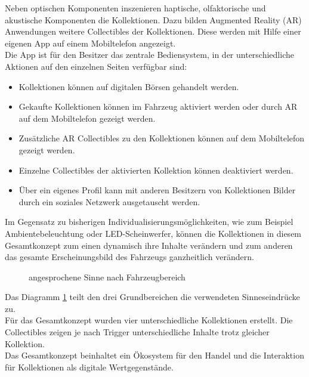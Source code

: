 Neben optischen Komponenten inszenieren haptische, olfaktorische und akustische Komponenten die Kollektionen. Dazu bilden Augmented Reality (AR) Anwendungen weitere Collectibles der Kollektionen. Diese werden mit Hilfe einer eigenen App auf einem Mobiltelefon angezeigt.\\
Die App ist für den Besitzer das zentrale Bediensystem, in der unterschiedliche Aktionen auf den einzelnen Seiten verfügbar sind:
\begin{itemize}
	\item Kollektionen können auf digitalen Börsen gehandelt werden.
	\item Gekaufte Kollektionen können im Fahrzeug aktiviert werden oder durch AR auf dem Mobiltelefon gezeigt werden.
	\item Zusätzliche AR Collectibles zu den Kollektionen können auf dem Mobiltelefon gezeigt werden.
	\item Einzelne Collectibles der aktivierten Kollektion können deaktiviert werden.
	\item Über ein eigenes Profil kann mit anderen Besitzern von Kollektionen Bilder durch ein soziales Netzwerk ausgetauscht werden.
\end{itemize}
Im Gegensatz zu bisherigen Individualisierungsmöglichkeiten, wie zum Beispiel Ambientebeleuchtung oder LED-Scheinwerfer, können die Kollektionen in diesem Gesamtkonzept zum einen dynamisch ihre Inhalte verändern und zum anderen das gesamte Erscheinungsbild des Fahrzeugs ganzheitlich verändern. \\
\begin{figure}[hbt]
	\centering
	
	\caption[angesprochene Sinne nach Fahrzeugbereich]{angesprochene Sinne nach Fahrzeugbereich}
	\label{fig:sinneeinteilung}
\end{figure}

Das Diagramm \ref{fig:sinneeinteilung} teilt den drei Grundbereichen die verwendeten Sinneseindrücke zu. \\
Für das Gesamtkonzept wurden vier unterschiedliche Kollektionen erstellt. Die Collectibles zeigen je nach Trigger unterschiedliche Inhalte trotz gleicher Kollektion. \\
Das Gesamtkonzept beinhaltet ein Ökosystem für den Handel und die Interaktion für Kollektionen als digitale Wertgegenstände.

